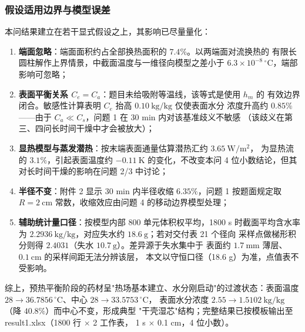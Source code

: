 \subsubsection{假设适用边界与模型误差}

本问结果建立在若干显式假设之上，其影响已尽量量化：
\begin{enumerate}
  \item \textbf{端面忽略}：端面面积约占全部换热面积的 $7.4\%$。以两端面对流换热的
        有限长圆柱解作上界情景，中截面温度与一维径向模型之差小于
        $6.3\times10^{-8}\,^{\circ}\mathrm{C}$，端部影响可忽略；
  \item \textbf{表面平衡关系 $C_e=C_a$}：题目未给吸附等温线，该等式是使用 $h_m$ 的
        有效边界闭合。敏感性计算表明 $C_e$ 抬高 $0.10\ \mathrm{kg/kg}$ 仅使表面水分
        浓度升高约 $0.85\%$——由于 $C_a\ll C_s$，问题 1 在 30 min 内对该基准歧义不敏感
        （该歧义在第三、四问长时间干燥中才会被放大）；
  \item \textbf{显热模型与蒸发潜热}：按末端表面通量估算潜热汇约 $3.65\ \mathrm{W/m^2}$，
        为显热流的 $3.1\%$，引起表面温度约 $-0.11\ \mathrm{K}$ 的变化，不改变本问
        4 位小数结论，但其对长时间干燥的影响在问题 2/3 中讨论；
  \item \textbf{半径不变}：附件 2 显示 30 min 内半径收缩 $6.35\%$，问题 1 按题面规定取
        $R=2\ \mathrm{cm}$ 常数，收缩效应由问题 4 的移动边界模型处理；
  \item \textbf{辅助统计量口径}：按模型内部 800 单元体积权平均，1800 s 时截面平均含水率为
        $2.2936\ \mathrm{kg/kg}$，对应失水约 $18.6\ \mathrm{g}$；若对交付表 21 个径向
        采样点做梯形积分则得 $2.4031$（失水 $10.7\ \mathrm{g}$）。差异源于失水集中于
        表面约 $1.7\ \mathrm{mm}$ 薄层、$0.1\ \mathrm{cm}$ 的采样间距无法分辨该层，
        本文以守恒口径（18.6 g）为准，点值表不受影响。
\end{enumerate}

综上，预热平衡阶段的药材呈"热场基本建立、水分刚启动"的过渡状态：表面温度
$28\to36.7856\,^{\circ}\mathrm{C}$、中心 $28\to33.5753\,^{\circ}\mathrm{C}$，
表面水分浓度 $2.55\to1.5102\ \mathrm{kg/kg}$（降 $40.8\%$）而中心不变，形成典型
"干壳湿芯"结构；完整结果已按模板输出至 result1.xlsx（1800 行 $\times$ 2 工作表，
1 s $\times$ 0.1 cm，4 位小数）。
